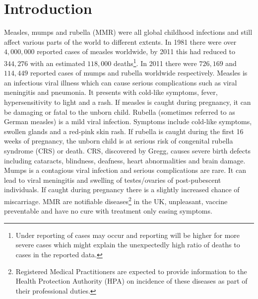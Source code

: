 \documentclass[a4paper,11pt] {scrartcl}
\begin{document}
\section{Introduction}
\label{sec:introduction}
Measles, mumps and rubella (MMR) were all global childhood infections and still affect various parts of the world to different extents. In 1981 there were over $4,000,000$ reported cases of measles worldwide, by 2011 this had reduced to $344,276$ with an estimated $118,000$ deaths\footnote{Under reporting of cases may occur and reporting will be higher for more severe cases which might explain the unexpectedly high ratio of deaths to cases in the reported data.}\cite{whomeasles}. In 2011 there were $726,169$ and $114,449$ reported cases of mumps and rubella worldwide respectively\cite{whoincidencedatabase}. Measles is an infectious viral illness which can cause serious complications such as viral meningitis and pneumonia. It presents with cold-like symptoms, fever, hypersensitivity to light and a rash. If measles is caught during pregnancy, it can be damaging or fatal to the unborn child\cite{nhschoicesmeasles}. Rubella (sometimes referred to as German measles) is a mild viral infection. Symptoms include cold-like symptoms, swollen glands and a red-pink skin rash. If rubella is caught during the first 16 weeks of pregnancy, the unborn child is at serious risk of congenital rubella syndrome (CRS) or death. CRS, discovered by Gregg\cite{gregg1941congenital}, causes severe birth defects including cataracts, blindness, deafness, heart abnormalities and brain damage\cite{nhschoicesrubella}. Mumps is a contagious viral infection and serious complications are rare. It can lead to viral meningitis and swelling of testes/ovaries of post-pubescent individuals. If caught during pregnancy there is a slightly increased chance of miscarriage\cite{nhschoicesmumpscomplications,nhschoicesmumps}. MMR are notifiable diseases\footnote{Registered Medical Practitioners are expected to provide information to the Health Protection Authority (HPA) on incidence of these diseases as part of their professional duties.}\cite{hpanotifiablediseases} in the UK, unpleasant, vaccine preventable and have no cure with treatment only easing symptoms.
\end{document}
